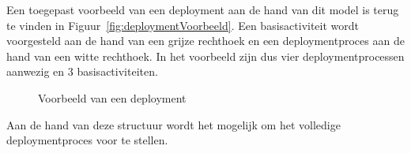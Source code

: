 Een toegepast voorbeeld van een deployment aan de hand van dit model is terug te vinden in Figuur~\vref{fig:deploymentVoorbeeld}.
Een basisactiviteit wordt voorgesteld aan de hand van een grijze rechthoek en een deploymentproces aan de hand van een witte rechthoek.
In het voorbeeld zijn dus vier deploymentprocessen aanwezig en 3 basisactiviteiten.

\begin{figure}[!ht]
\centering
{}
\caption{Voorbeeld van een deployment \citep{lestideau2003providing}}
\label{fig:deploymentVoorbeeld}
\end{figure}

Aan de hand van deze structuur wordt het mogelijk om het volledige deploymentproces voor te stellen.


